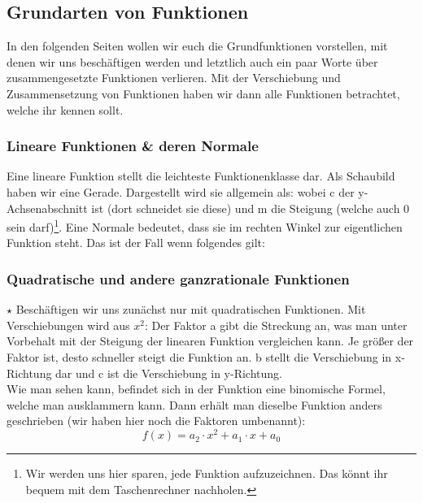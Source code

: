 \subsection{Grundarten von Funktionen}
	In den folgenden Seiten wollen wir euch die Grundfunktionen vorstellen, mit
	denen wir uns beschäftigen werden und letztlich auch ein paar Worte über
	zusammengesetzte Funktionen verlieren. Mit der Verschiebung und Zusammensetzung
	von Funktionen haben wir dann alle Funktionen betrachtet, welche ihr kennen
	sollt.

	\subsubsection{Lineare Funktionen \& deren Normale}
		Eine lineare Funktion stellt die leichteste Funktionenklasse dar. Als
		Schaubild haben wir eine Gerade. Dargestellt wird sie allgemein als:
		\formel{\[f(x)=m\cdot x+c\]}
		wobei c der y-Achsenabschnitt ist (dort schneidet sie diese) und m die
		Steigung (welche auch 0 sein darf)\footnote{Wir werden uns hier sparen, jede
		Funktion aufzuzeichnen. Das könnt ihr bequem mit dem Taschenrechner
		nachholen.}. Eine Normale bedeutet, dass sie im rechten Winkel zur
		eigentlichen Funktion steht. Das ist der Fall wenn folgendes gilt:
		\formel{\[m_2=-\frac{1}{m_1}\]}
		

	\subsubsection{Quadratische und andere ganzrationale Funktionen}
		\(\star\) Beschäftigen wir uns zunächst nur mit quadratischen Funktionen. Mit
		Verschiebungen wird aus \(x^2\):
		\formel{\[f(x)=a(x-b)^2+c\]}
		Der Faktor a gibt die Streckung an, was man unter Vorbehalt mit der Steigung
		der linearen Funktion vergleichen kann. Je größer der Faktor ist, desto
		schneller steigt die Funktion an. b  stellt die Verschiebung in x-Richtung dar
		und c ist die Verschiebung in y-Richtung.\\
		Wie man sehen kann, befindet sich in der Funktion eine binomische Formel,
		welche man ausklammern kann. Dann erhält man dieselbe Funktion anders
		geschrieben (wir haben hier noch die Faktoren umbenannt):
		\[f(x)=a_2 \cdot x^2+a_1 \cdot x+a_0\]

